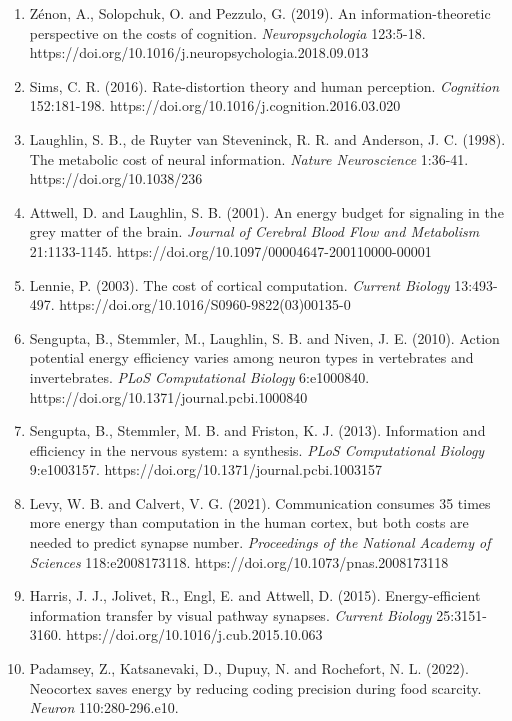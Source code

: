 \documentclass[
  10pt,
]{article}
\begin{document}
\begin{enumerate}
  (2015). Information-theoretic bounded rationality. arXiv:1512.06789
  (preprint).
\item
  Zénon, A., Solopchuk, O. and Pezzulo, G. (2019). An
  information-theoretic perspective on the costs of cognition.
  \emph{Neuropsychologia} 123:5-18.
  https://doi.org/10.1016/j.neuropsychologia.2018.09.013
\item
  Sims, C. R. (2016). Rate-distortion theory and human perception.
  \emph{Cognition} 152:181-198.
  https://doi.org/10.1016/j.cognition.2016.03.020
\item
  Laughlin, S. B., de Ruyter van Steveninck, R. R. and Anderson, J. C.
  (1998). The metabolic cost of neural information. \emph{Nature
  Neuroscience} 1:36-41. https://doi.org/10.1038/236
\item
  Attwell, D. and Laughlin, S. B. (2001). An energy budget for signaling
  in the grey matter of the brain. \emph{Journal of Cerebral Blood Flow
  and Metabolism} 21:1133-1145.
  https://doi.org/10.1097/00004647-200110000-00001
\item
  Lennie, P. (2003). The cost of cortical computation. \emph{Current
  Biology} 13:493-497. https://doi.org/10.1016/S0960-9822(03)00135-0
\item
  Sengupta, B., Stemmler, M., Laughlin, S. B. and Niven, J. E. (2010).
  Action potential energy efficiency varies among neuron types in
  vertebrates and invertebrates. \emph{PLoS Computational Biology}
  6:e1000840. https://doi.org/10.1371/journal.pcbi.1000840
\item
  Sengupta, B., Stemmler, M. B. and Friston, K. J. (2013). Information
  and efficiency in the nervous system: a synthesis. \emph{PLoS
  Computational Biology} 9:e1003157.
  https://doi.org/10.1371/journal.pcbi.1003157
\item
  Levy, W. B. and Calvert, V. G. (2021). Communication consumes 35 times
  more energy than computation in the human cortex, but both costs are
  needed to predict synapse number. \emph{Proceedings of the National
  Academy of Sciences} 118:e2008173118.
  https://doi.org/10.1073/pnas.2008173118
\item
  Harris, J. J., Jolivet, R., Engl, E. and Attwell, D. (2015).
  Energy-efficient information transfer by visual pathway synapses.
  \emph{Current Biology} 25:3151-3160.
  https://doi.org/10.1016/j.cub.2015.10.063
\item
  Padamsey, Z., Katsanevaki, D., Dupuy, N. and Rochefort, N. L. (2022).
  Neocortex saves energy by reducing coding precision during food
  scarcity. \emph{Neuron} 110:280-296.e10.

\end{enumerate}
\end{document}
